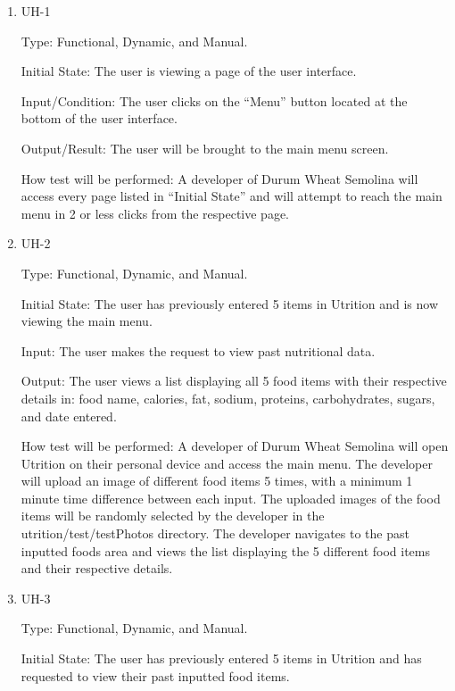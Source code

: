 \documentclass[12pt, titlepage]{article}
\begin{document}
	
	\begin{enumerate}
		
		\item{UH-1}
		
		Type: Functional, Dynamic, and Manual.
		
		Initial State: The user is viewing a page of the user interface.
		
		Input/Condition: The user clicks on the “Menu” button located at the bottom of the user interface.
		
		Output/Result: The user will be brought to the main menu screen.
		
		How test will be performed: A developer of Durum Wheat Semolina will access every page listed in “Initial State” and will attempt to reach the main menu in 2 or less clicks from the respective page.
		
		
		\item{UH-2}
		
		Type: Functional, Dynamic, and Manual.
		
		Initial State: The user has previously entered 5 items in Utrition and is now viewing the main menu.
		
		Input: The user makes the request to view past nutritional data.
		
		Output: The user views a list displaying all 5 food items with their respective details in: food name, calories, fat, sodium, proteins, carbohydrates, sugars, and date entered.
		
		How test will be performed: A developer of Durum Wheat Semolina will open Utrition on their personal device and access the main menu. The developer will upload an image of different food items 5 times, with a minimum 1 minute time difference between each input. The uploaded images of the food items will be randomly selected by the developer in the utrition/test/testPhotos directory. The developer navigates to the past inputted foods area and views the list displaying the 5 different food items and their respective details.
		
		\item{UH-3}
		
		Type: Functional, Dynamic, and Manual.
		
		Initial State: The user has previously entered 5 items in Utrition and has requested to view their past inputted food items.
		

\end{enumerate}
\end{document}
